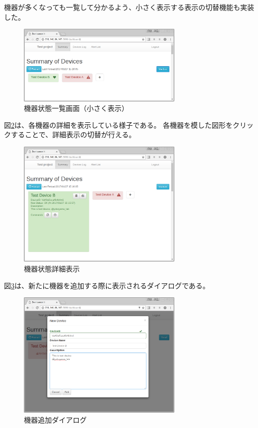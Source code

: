 \begin{itemize}
		機器が多くなっても一覧して分かるよう、小さく表示する表示の切替機能も実装した。
		\begin{figure}[htbp]
		\includegraphics[width=8cm]{images/screenshot_summary2.png}
		\caption{機器状態一覧画面（小さく表示）}
		\label{fig:ss_sum2}
		\end{figure}
		
		図\ref{fig:ss_more}は、各機器の詳細を表示している様子である。
		各機器を模した図形をクリックすることで、詳細表示の切替が行える。
		\begin{figure}[htbp]
		\includegraphics[width=8cm]{images/screenshot_more.png}
		\caption{機器状態詳細表示}
		\label{fig:ss_more}
		\end{figure}

		図\ref{fig:ss_add}は、新たに機器を追加する際に表示されるダイアログである。
		\begin{figure}[htbp]
		\includegraphics[width=8cm]{images/screenshot_add.png}
		\caption{機器追加ダイアログ}
		\label{fig:ss_add}
		\end{figure}


\end{itemize}
